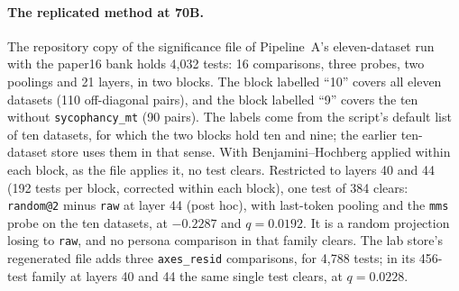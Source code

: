 \paragraph{The replicated method at 70B.}
The repository copy of the significance file of Pipeline~A's eleven-dataset run with the paper16 bank holds 4{,}032 tests: 16 comparisons, three probes, two poolings and 21 layers, in two blocks. %
The block labelled ``10'' covers all eleven datasets (110 off-diagonal pairs), and the block labelled ``9'' covers the ten without \texttt{sycophancy\_mt} (90 pairs). %
The labels come from the script's default list of ten datasets, for which the two blocks hold ten and nine; the earlier ten-dataset store uses them in that sense. %
With Benjamini--Hochberg applied within each block, as the file applies it, no test clears. %
Restricted to layers 40 and 44 (192 tests per block, corrected within each block), one test of 384 clears: \texttt{random@2} minus \texttt{raw} at layer 44 (post hoc), with last-token pooling and the \texttt{mms} probe on the ten datasets, at $-0.2287$ and $q=0.0192$. %
It is a random projection losing to \texttt{raw}, and no persona comparison in that family clears. %
The lab store's regenerated file adds three \texttt{axes\_resid} comparisons, for 4{,}788 tests; in its 456-test family at layers 40 and 44 the same single test clears, at $q=0.0228$. %
